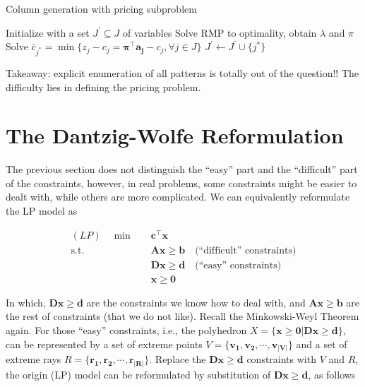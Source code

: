             \begin{algorithm}[!htp]
                \centering
                \caption{Column generation with pricing subproblem}
                \begin{algorithmic}
                    \State Initialize with a set $J^\prime \subseteq J$ of variables
                    \Repeat
                        \State Solve RMP to optimality, obtain $\lambda$ and $\pi$
                        \State Solve $\bar{c}_{j^*} = \min \{z_j - c_j = \mathbf{\pi^\top a_j} - c_j, \forall j \in J\}$
                            \State $J^\prime \gets J^\prime \cup \{j^*\}$
                        \EndIf
                \end{algorithmic}
            \end{algorithm}

            Takeaway: explicit enumeration of all patterns is totally out of the question!! The difficulty lies in defining the pricing problem.

        \section{The Dantzig-Wolfe Reformulation}
            The previous section does not distinguish the ``easy'' part and the ``difficult'' part of the constraints, however, in real problems, some constraints might be easier to dealt with, while others are more complicated. We can equivalently reformulate the LP model as

            \begin{align*}
                (LP) \quad \min \quad & \mathbf{c^\top x}\\
                \text{s.t.} \quad & \mathbf{Ax \ge b} \quad \text{(``difficult'' constraints)}\\
                & \mathbf{Dx \ge d} \quad \text{(``easy'' constraints)} \\
                & \mathbf{x \ge 0}
            \end{align*}

            In which, $\mathbf{Dx \ge d}$ are the constraints we know how to deal with, and $\mathbf{Ax \ge b}$ are the rest of constraints (that we do not like). Recall the Minkowski-Weyl Theorem again. For those ``easy'' constraints, i.e., the polyhedron $X = \{\mathbf{x \ge 0} | \mathbf{Dx \ge d}\}$, can be represented by a set of extreme points $V = \{\mathbf{v_1}, \mathbf{v_2}, \cdots, \mathbf{v_{|V|}}\}$ and a set of extreme rays $R = \{\mathbf{r_1}, \mathbf{r_2}, \cdots, \mathbf{r_{|R|}}\}$. Replace the $\mathbf{Dx \ge d}$ constraints with $V$ and $R$, the origin (LP) model can be reformulated by substitution of $\mathbf{Dx \ge d}$, as follows


